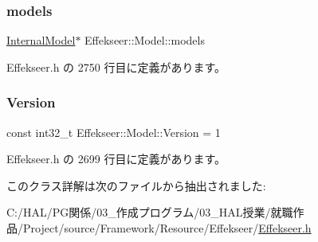 \subsubsection{\texorpdfstring{models}{models}}
{\footnotesize\ttfamily \mbox{\hyperlink{struct_effekseer_1_1_model_1_1_internal_model}{Internal\+Model}}$\ast$ Effekseer\+::\+Model\+::models\hspace{0.3cm}{\ttfamily [private]}}



 Effekseer.\+h の 2750 行目に定義があります。

\mbox{\label{class_effekseer_1_1_model_a9f5c2f10fde65efeb5bc603ed9d6436e}} 
\subsubsection{\texorpdfstring{Version}{Version}}
{\footnotesize\ttfamily const int32\+\_\+t Effekseer\+::\+Model\+::\+Version = 1\hspace{0.3cm}{\ttfamily [static]}}



 Effekseer.\+h の 2699 行目に定義があります。



このクラス詳解は次のファイルから抽出されました\+:\begin{DoxyCompactItemize}
\item 
C\+:/\+H\+A\+L/\+P\+G関係/03\+\_\+作成プログラム/03\+\_\+\+H\+A\+L授業/就職作品/\+Project/source/\+Framework/\+Resource/\+Effekseer/\mbox{\hyperlink{_effekseer_8h}{Effekseer.\+h}}\end{DoxyCompactItemize}
